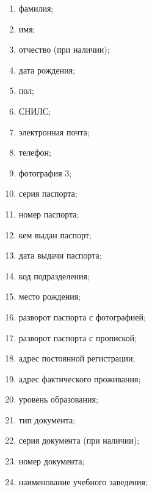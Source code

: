 \begin{enumerate} 
  \item фамилия;
  
  \item имя;
  
  \item отчество (при наличии);
  
  \item дата рождения;
  
  \item пол;
  
  \item СНИЛС;
  
  \item электронная почта;
  
  \item телефон;
  
  \item фотография 3;
  
  \item серия паспорта;
  
  \item номер паспорта;
  
  \item кем выдан паспорт;
  
  \item дата выдачи паспорта;
  
  \item код подразделения;
  
  \item место рождения;
  
  \item разворот паспорта с фотографией;
  
  \item разворот паспорта с пропиской;
  
  \item адрес постоянной регистрации;
  
  \item адрес фактического проживания;
  
  \item уровень образования;
  
  \item тип документа;
  
  \item серия документа (при наличии);
  
  \item номер документа;
  
  \item наименование учебного заведения;
  

\end{enumerate}
